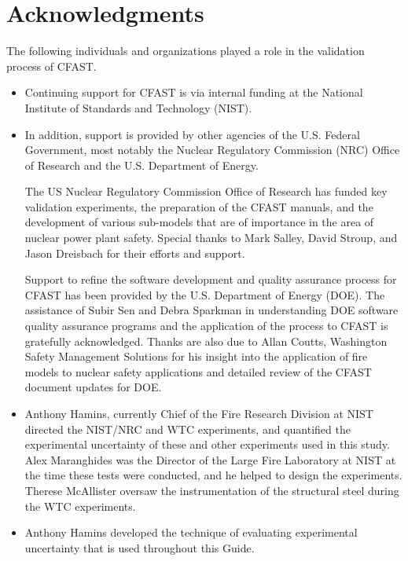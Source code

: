 \documentclass[12pt]{book}
\begin{document}
\chapter{Acknowledgments}

\label{acksection}

The following individuals and organizations played a role in the validation process of CFAST.
\begin{itemize}
\item Continuing support for CFAST is via internal funding at the National Institute of Standards and Technology (NIST).

\item In addition, support is provided by other agencies of the U.S. Federal Government, most notably the Nuclear Regulatory Commission (NRC) Office of Research and the U.S. Department of Energy.

The US Nuclear Regulatory Commission Office of Research has funded key validation experiments, the preparation of the CFAST manuals, and the development of various sub-models that are of importance in the area of nuclear power plant safety. Special thanks to Mark Salley, David Stroup, and Jason Dreisbach for their efforts and support.

Support to refine the software development and quality assurance process for CFAST has been provided by the U.S. Department of Energy (DOE). The assistance of Subir Sen and Debra Sparkman in understanding DOE software quality assurance programs and the application of the process to CFAST is gratefully acknowledged.  Thanks are also due to Allan Coutts, Washington Safety Management Solutions for his insight into the application of fire models to nuclear safety applications and detailed review of the CFAST document updates for DOE.

\item Anthony Hamins, currently Chief of the Fire Research Division at NIST directed the NIST/NRC and WTC experiments, and quantified the experimental uncertainty of these and other experiments used in this study. Alex Maranghides was the Director of the Large Fire Laboratory at NIST at the time these tests were conducted, and he helped to design the experiments. Therese McAllister oversaw the instrumentation of the structural steel during the WTC experiments.

\item Anthony Hamins developed the technique of evaluating experimental uncertainty that is used throughout this Guide.


\end{itemize}
\end{document}
